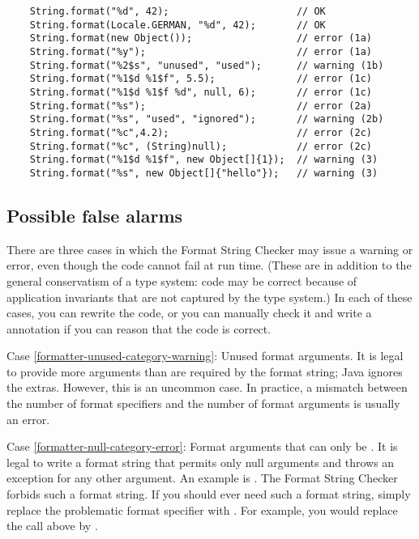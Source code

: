 \begin{Verbatim}
    String.format("%d", 42);                      // OK
    String.format(Locale.GERMAN, "%d", 42);       // OK
    String.format(new Object());                  // error (1a)
    String.format("%y");                          // error (1a)
    String.format("%2$s", "unused", "used");      // warning (1b)
    String.format("%1$d %1$f", 5.5);              // error (1c)
    String.format("%1$d %1$f %d", null, 6);       // error (1c)
    String.format("%s");                          // error (2a)
    String.format("%s", "used", "ignored");       // warning (2b)
    String.format("%c",4.2);                      // error (2c)
    String.format("%c", (String)null);            // error (2c)
    String.format("%1$d %1$f", new Object[]{1});  // warning (3)
    String.format("%s", new Object[]{"hello"});   // warning (3)
\end{Verbatim}

\subsection{Possible false alarms\label{formatter-false-alarms}}

There are three cases in which the Format String Checker may issue a
warning or error, even though the code cannot fail at run time.
(These are in addition to the general conservatism of a type system:  code
may be correct because of application invariants that are not captured by
the type system.)
In each of these cases, you can rewrite the code, or you can manually check
it and write a  annotation if you can reason that
the code is correct.


Case \ref{formatter-unused-category-warning}:
  Unused format arguments.  It is legal to provide more arguments than are
  required by the format string; Java ignores the extras.  However, this is
  an uncommon case.  In practice, a mismatch between the number of format
  specifiers and the number of format arguments is usually an error.

Case \ref{formatter-null-category-error}:
  Format arguments that can only be .
  It is legal to write a format string that permits only null arguments and
  throws an exception for any other argument.  An example is
  . 
  The Format String Checker forbids such a format string.
  If you should ever need such a format string, simply replace the problematic
  format specifier with .  For example, you would replace the
  call above by .

